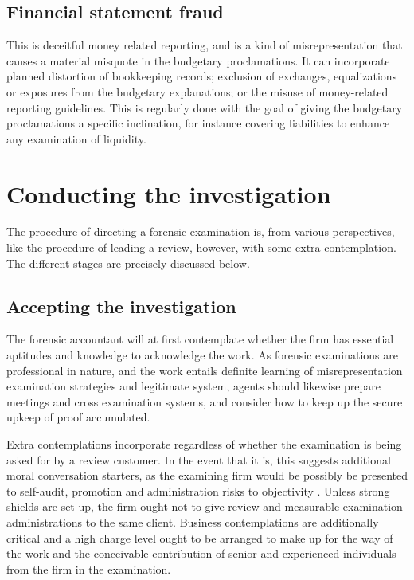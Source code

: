 \subsection{Financial statement fraud}

This is deceitful money related reporting, and is a kind of misrepresentation that causes a material misquote in the budgetary proclamations. It can incorporate planned distortion of bookkeeping records; exclusion of exchanges, equalizations or exposures from the budgetary explanations; or the misuse of money-related reporting guidelines. This is regularly done with the goal of giving the budgetary proclamations a specific inclination, for instance covering liabilities to enhance any examination of liquidity.


\section{Conducting the investigation}

The procedure of directing a forensic examination is, from various perspectives, like the procedure of leading a review, however, with some extra contemplation. The different stages are precisely discussed below.

\subsection{Accepting the investigation}

The forensic accountant will at first contemplate whether the firm has essential aptitudes and knowledge to acknowledge the work. As forensic examinations are professional in nature, and the work entails definite learning of misrepresentation examination strategies and legitimate system, agents should likewise prepare meetings and cross examination systems, and consider how to keep up the secure upkeep of proof accumulated.

Extra contemplations incorporate regardless of whether the examination is being asked for by a review customer. In the event that it is, this suggests additional moral conversation starters, as the examining firm would be possibly be presented to self-audit, promotion and administration risks to objectivity . Unless strong shields are set up, the firm ought not to give review and measurable examination administrations to the same client. Business contemplations are additionally critical and a high charge level ought to be arranged to make up for the way of the work and the conceivable contribution of senior and experienced individuals from the firm in the examination.


